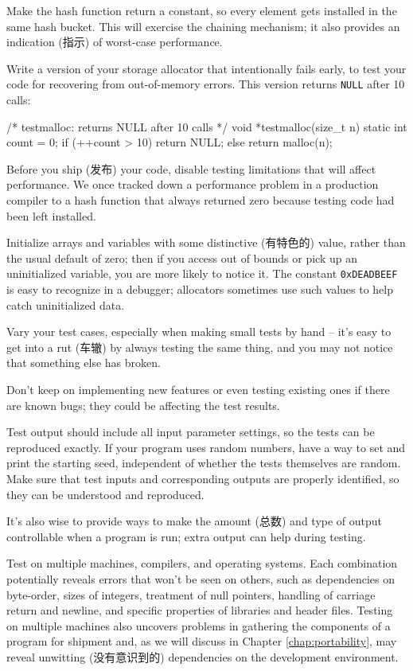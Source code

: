 Make the hash function return a constant, so every element gets installed
in the same hash bucket. This will exercise the chaining mechanism; it also
provides an indication (指示) of worst-case performance.

Write a version of your storage allocator that intentionally fails early,
to test your code for recovering from out-of-memory errors. This version
returns \verb'NULL' after 10 calls:
\begin{wellcode}
    /* testmalloc: returns NULL after 10 calls */
    void *testmalloc(size_t n)
    {
        static int count = 0;
        if (++count > 10)
            return NULL;
        else
            return malloc(n);
    }
\end{wellcode}

Before you ship (发布) your code, disable testing limitations that will
affect performance.  We once tracked down a performance problem in a
production compiler to a hash function that always returned zero because
testing code had been left installed.

Initialize arrays and variables with some distinctive (有特色的) value,
rather than the usual default of zero; then if you access out of bounds or
pick up an uninitialized variable, you are more likely to notice it. The
constant \verb'0xDEADBEEF' is easy to recognize in a debugger; allocators
sometimes use such values to help catch uninitialized data.

Vary your test cases, especially when making small tests by hand -- it's
easy to get into a rut (车辙) by always testing the same thing, and you may
not notice that something else has broken.

Don't keep on implementing new features or even testing existing ones if
there are known bugs; they could be affecting the test results.

Test output should include all input parameter settings, so the tests can
be reproduced exactly. If your program uses random numbers, have a way to
set and print the starting seed, independent of whether the tests
themselves are random. Make sure that test inputs and corresponding outputs
are properly identified, so they can be understood and reproduced.

It's also wise to provide ways to make the amount (总数) and type of output
controllable when a program is run; extra output can help during testing.

Test on multiple machines, compilers, and operating systems. Each
combination potentially reveals errors that won't be seen on others, such
as dependencies on byte-order, sizes of integers, treatment of null
pointers, handling of carriage return and newline, and specific properties
of libraries and header files. Testing on multiple machines also uncovers
problems in gathering the components of a program for shipment and, as we
will discuss in Chapter \ref{chap:portability}, may reveal unwitting
(没有意识到的) dependencies on the development environment.

